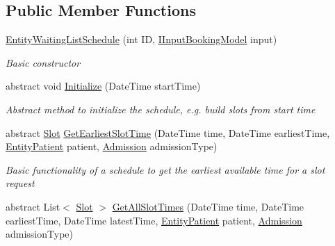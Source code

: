 \subsection*{Public Member Functions}
\begin{DoxyCompactItemize}
\item 
\hyperlink{class_general_health_care_elements_1_1_booking_models_1_1_entity_waiting_list_schedule_a0b62a55ca7c482e56acc3a7ddce1f62d}{Entity\+Waiting\+List\+Schedule} (int ID, \hyperlink{interface_general_health_care_elements_1_1_department_models_1_1_outpatient_1_1_i_input_booking_model}{I\+Input\+Booking\+Model} input)
\begin{DoxyCompactList}\small\item\em Basic constructor \end{DoxyCompactList}\item 
abstract void \hyperlink{class_general_health_care_elements_1_1_booking_models_1_1_entity_waiting_list_schedule_a252eb13c100e62bfe44db2bf250be437}{Initialize} (Date\+Time start\+Time)
\begin{DoxyCompactList}\small\item\em Abstract method to initialize the schedule, e.\+g. build slots from start time \end{DoxyCompactList}\item 
abstract \hyperlink{class_general_health_care_elements_1_1_booking_models_1_1_slot}{Slot} \hyperlink{class_general_health_care_elements_1_1_booking_models_1_1_entity_waiting_list_schedule_a1e2b35302da34a2111e7b34d1a67ca29}{Get\+Earliest\+Slot\+Time} (Date\+Time time, Date\+Time earliest\+Time, \hyperlink{class_general_health_care_elements_1_1_entities_1_1_entity_patient}{Entity\+Patient} patient, \hyperlink{class_general_health_care_elements_1_1_treatment_admission_types_1_1_admission}{Admission} admission\+Type)
\begin{DoxyCompactList}\small\item\em Basic functionality of a schedule to get the earliest available time for a slot request \end{DoxyCompactList}\item 
abstract List$<$ \hyperlink{class_general_health_care_elements_1_1_booking_models_1_1_slot}{Slot} $>$ \hyperlink{class_general_health_care_elements_1_1_booking_models_1_1_entity_waiting_list_schedule_a9a376fd81d5032014522947bbaf315c6}{Get\+All\+Slot\+Times} (Date\+Time time, Date\+Time earliest\+Time, Date\+Time latest\+Time, \hyperlink{class_general_health_care_elements_1_1_entities_1_1_entity_patient}{Entity\+Patient} patient, \hyperlink{class_general_health_care_elements_1_1_treatment_admission_types_1_1_admission}{Admission} admission\+Type)

\end{DoxyCompactItemize}
